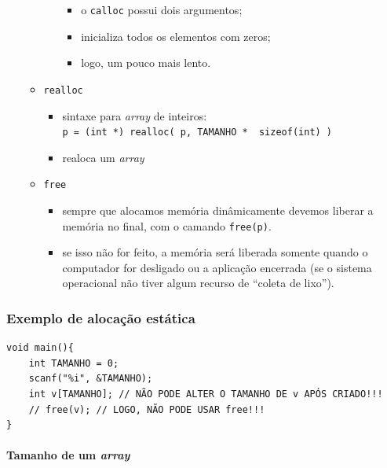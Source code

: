 \documentclass[12pt,a4paper]{article}
\providecommand{\tightlist}{%
      \setlength{\itemsep}{0pt}\setlength{\parskip}{0pt}}
\begin{document}
\begin{itemize}
\begin{itemize}
\begin{itemize}
      \begin{itemize}
      \tightlist
      \item
        o \texttt{calloc} possui dois argumentos;
      \item
        inicializa todos os elementos com zeros;
      \item
        logo, um pouco mais lento.
      \end{itemize}
    \end{itemize}
  \item
    \texttt{realloc}

    \begin{itemize}
    \tightlist
    \item
      sintaxe para \emph{array} de inteiros:
      \texttt{p\ =\ (int\ *)\ realloc(\ p,\ TAMANHO\ *\ \ sizeof(int)\ )}
    \item
      realoca um \emph{array}
    \end{itemize}
  \item
    \texttt{free}

    \begin{itemize}
    \tightlist
    \item
      sempre que alocamos memória dinâmicamente devemos liberar a
      memória no final, com o camando \texttt{free(p)}.
    \item
      se isso não for feito, a memória será liberada somente quando o
      computador for desligado ou a aplicação encerrada (se o sistema
      operacional não tiver algum recurso de ``coleta de lixo'').
    \end{itemize}
  \end{itemize}
\end{itemize}

    \hypertarget{exemplo-de-alocauxe7uxe3o-estuxe1tica}{%
\subsubsection{Exemplo de alocação
estática}\label{exemplo-de-alocauxe7uxe3o-estuxe1tica}}

\begin{verbatim}
void main(){
    int TAMANHO = 0;
    scanf("%i", &TAMANHO);
    int v[TAMANHO]; // NÃO PODE ALTER O TAMANHO DE v APÓS CRIADO!!!
    // free(v); // LOGO, NÃO PODE USAR free!!!
}
\end{verbatim}

\hypertarget{tamanho-de-um-array}{%
\paragraph{\texorpdfstring{Tamanho de um
\emph{array}}{Tamanho de um array}}\label{tamanho-de-um-array}}
\end{document}

